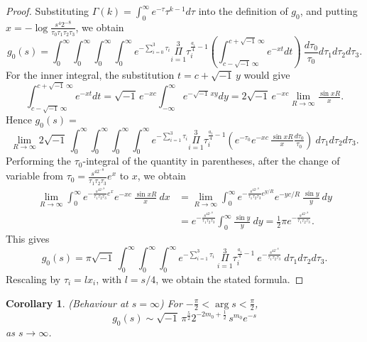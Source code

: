 \documentclass[a4paper,12pt,leqno]{amsart}
\numberwithin{equation}{section}
\theoremstyle{plain}
\newtheorem{corollary}[theorem]{Corollary}
\theoremstyle{definition}
\newcommand{\Ga}{\Gamma}
\DeclareMathOperator{\argu}{arg}
\renewcommand{\i}{ {\scriptscriptstyle\sqrt{-1}}\, }
\newcommand{\ii}{ {\scriptstyle\sqrt{-1}}\, }
\newcommand{\nn}{m}
\begin{document}
\begin{proof}
Substituting $\Ga(k)=\int_0^\infty e^{-\tau} \tau^{k-1} d\tau$ into the definition of $g_0$, and putting $x=-\log\frac{s^4 2^{-8}}{\tau_0\tau_1\tau_2\tau_3}$, we obtain
\[
g_0(s)=
\int_{0}^{\infty} \!\!\!\! \int_{0}^{\infty}  \!\!\!\! \int_{0}^{\infty} \!\!\!\! \int_{0}^{\infty}
e^{-\sum_{i=0}^3 \tau_i} 
\overset{\scriptstyle 3}{\underset{\scriptstyle i=1}\Pi}
\tau_i^{\frac{a_i}4-1} 
\left(
\int_{c-\i\infty}^{c+\i\infty} e^{-xt} dt
\right)
\ 
\frac{d\tau_0}{\tau_0}d\tau_1d\tau_2d\tau_3.
\]
For the inner integral, the substitution $t=c+\ii y$ would give
\[
\int_{c-\i\infty}^{c+\i\infty} e^{-xt} dt =
\ii e^{-xc} \int_{-\infty}^{\infty} e^{-\i x y} dy=
2\ii e^{-xc} \lim_{R\to\infty} \tfrac{\sin xR}{x}.
\]
Hence $g_0(s)=$
\[
\lim_{R\to\infty}
2\ii
\int_{0}^{\infty} \!\!\!\! \int_{0}^{\infty}  \!\!\!\! \int_{0}^{\infty} \!\!\!\! \int_{0}^{\infty}
e^{-\sum_{i=1}^3 \tau_i} 
\overset{\scriptstyle 3}{\underset{\scriptstyle i=1}\Pi}
\tau_i^{\frac{a_i}4-1} 
\left(
e^{-\tau_0}
e^{-xc}  \,  \tfrac{\sin xR}{x}
\tfrac{d\tau_0}{\tau_0}
\right)
\ 
d\tau_1d\tau_2d\tau_3.
\]
Performing the $\tau_0$-integral of the quantity in parentheses, after the change of variable from $\tau_0=\frac{s^42^{-8}}{\tau_1\tau_2\tau_3} e^x$ to $x$, we obtain
\begin{align*}
\lim_{R\to\infty}
\int_{0}^{\infty}
e^{- \frac{s^42^{-8}}{\tau_1\tau_2\tau_3} e^x}
e^{-xc}
\ 
\tfrac{\sin xR}{x}
\ 
dx
&=
\lim_{R\to\infty}
\int_{0}^{\infty}
e^{- \frac{s^42^{-8}}{\tau_1\tau_2\tau_3} e^{y/R}}
e^{-yc/R}
\ 
\tfrac{\sin y}{y}
\ 
dy
\\
&=
e^{- \frac{s^42^{-8}}{\tau_1\tau_2\tau_3}} 
\int_{0}^{\infty}
\tfrac{\sin y}{y}
\ 
dy
=
\tfrac12\pi e^{- \frac{s^42^{-8}}{\tau_1\tau_2\tau_3}}.
\end{align*}
This gives
\[
g_0(s)=\pi \ii
\int_{0}^{\infty} \!\!\!\! \int_{0}^{\infty}  \!\!\!\! \int_{0}^{\infty}
e^{-\sum_{i=1}^3 \tau_i} 
\ 
\overset{\scriptstyle 3}{\underset{\scriptstyle i=1}\Pi}
\tau_i^{\frac{a_i}4-1} 
\ 
e^{- \frac{s^42^{-8}}{\tau_1\tau_2\tau_3}}
\ 
d\tau_1d\tau_2d\tau_3.
\]
Rescaling by $\tau_i=lx_i$, with $l=s/4$, we obtain the stated formula.
\end{proof}

\begin{corollary}\label{laplace} {\em (Behaviour at $s=\infty$)} For $-\tfrac{\pi}2<\argu s <\tfrac\pi2$, 
\[
g_0(s)\sim 
\ii \pi^{\frac52} 2^{-2\nn_0+\frac12} \, s^{\nn_0} e^{-s}
\]
as $s\to\infty$.
\end{corollary}
\end{document}
